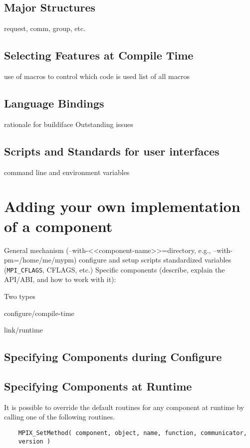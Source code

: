 \documentclass{report}
\begin{document}
\section{Major Structures}
      request, comm, group, etc.

\section{Selecting Features at Compile Time}
     use of macros to control which code is used
     list of all macros

\section{Language Bindings}
           rationale for buildiface
           Outstanding issues

\section{Scripts and Standards for user interfaces}
           command line and environment variables

\chapter{Adding your own implementation of a component}
         General mechanism (--with-<<component-name>>=directory, e.g., --with-pm=/home/me/mypm)
              configure and setup scripts
              standardized variables (\texttt{MPI\_CFLAGS}, CFLAGS, etc.)
         Specific components (describe, explain the API/ABI, and how to work with it):

Two types 

configure/compile-time

link/runtime

\section{Specifying Components during Configure}

\section{Specifying Components at Runtime}

It is possible to override the default routines for any component at
runtime by calling one of the following routines.

\begin{verbatim}
    MPIX_SetMethod( component, object, name, function, communicator,
    version )
\end{verbatim}
\end{document}
